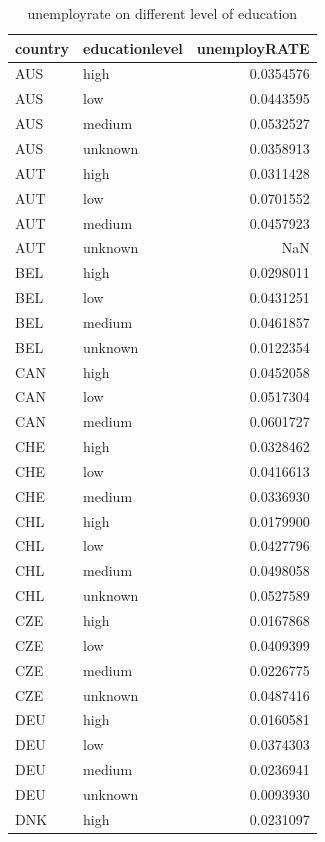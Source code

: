\documentclass[11pt,a4paper,]{article}
\begin{document}
\begin{table}

\caption{\label{tab:unnamed-chunk-11}unemployrate on different level of education}
\centering
\begin{tabular}[t]{l|l|r}
\hline
country & educationlevel & unemployRATE\\
\hline
AUS & high & 0.0354576\\
\hline
AUS & low & 0.0443595\\
\hline
AUS & medium & 0.0532527\\
\hline
AUS & unknown & 0.0358913\\
\hline
AUT & high & 0.0311428\\
\hline
AUT & low & 0.0701552\\
\hline
AUT & medium & 0.0457923\\
\hline
AUT & unknown & NaN\\
\hline
BEL & high & 0.0298011\\
\hline
BEL & low & 0.0431251\\
\hline
BEL & medium & 0.0461857\\
\hline
BEL & unknown & 0.0122354\\
\hline
CAN & high & 0.0452058\\
\hline
CAN & low & 0.0517304\\
\hline
CAN & medium & 0.0601727\\
\hline
CHE & high & 0.0328462\\
\hline
CHE & low & 0.0416613\\
\hline
CHE & medium & 0.0336930\\
\hline
CHL & high & 0.0179900\\
\hline
CHL & low & 0.0427796\\
\hline
CHL & medium & 0.0498058\\
\hline
CHL & unknown & 0.0527589\\
\hline
CZE & high & 0.0167868\\
\hline
CZE & low & 0.0409399\\
\hline
CZE & medium & 0.0226775\\
\hline
CZE & unknown & 0.0487416\\
\hline
DEU & high & 0.0160581\\
\hline
DEU & low & 0.0374303\\
\hline
DEU & medium & 0.0236941\\
\hline
DEU & unknown & 0.0093930\\
\hline
DNK & high & 0.0231097\\
\hline

\end{tabular}
\end{table}
\end{document}
